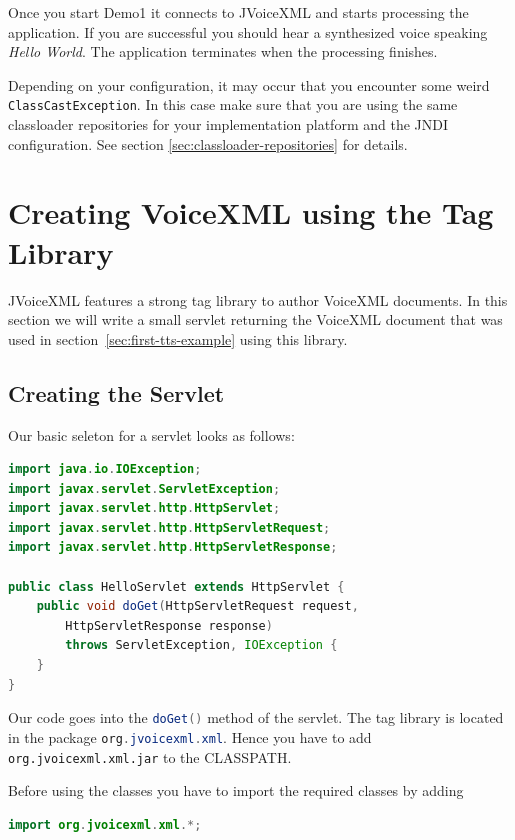 \documentclass[11pt,a4paper]{book}
\begin{document}
Once you start Demo1 it connects to JVoiceXML and starts processing
the application. If you are successful you should hear a synthesized voice
speaking \emph{Hello World}. The application terminates when the processing
finishes.

Depending on your configuration, it may occur that you encounter some weird
\lstinline{ClassCastException}. In this case make sure that you are using the
same classloader repositories for your implementation platform and the
JNDI configuration. See section \ref{sec:classloader-repositories} for
details.

\section{Creating VoiceXML using the Tag Library}

JVoiceXML features a strong tag library to author VoiceXML documents. In
this section we will write a small servlet returning the VoiceXML document that
was used in section~\ref{sec:first-tts-example} using this library.

\subsection{Creating the Servlet}

Our basic seleton for a servlet looks as follows:

\begin{lstlisting}[language=Java]
import java.io.IOException;
import javax.servlet.ServletException;
import javax.servlet.http.HttpServlet;
import javax.servlet.http.HttpServletRequest;
import javax.servlet.http.HttpServletResponse;

public class HelloServlet extends HttpServlet {
    public void doGet(HttpServletRequest request,
        HttpServletResponse response)
        throws ServletException, IOException {
    }
}
\end{lstlisting}

Our code goes into the \lstinline[language=Java]{doGet()} method of the servlet. The tag library
is located in the package \lstinline[language=Java]{org.jvoicexml.xml}. Hence you have to add
\texttt{org.jvoicexml.xml.jar} to the CLASSPATH.

Before using the classes you have to import the required classes by adding
\begin{lstlisting}[language=Java]
import org.jvoicexml.xml.*;
\end{lstlisting}
\end{document}
